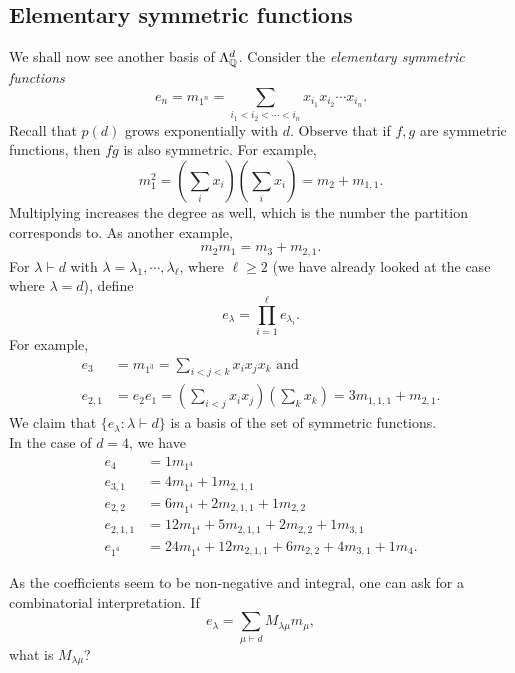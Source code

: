 \subsection{Elementary symmetric functions}

	We shall now see another basis of $\Lambda_{\mathbb{Q}}^d$. Consider the \emph{elementary symmetric functions}
	\[ e_{n} = m_{1^n} = \sum_{i_1 < i_2 < \cdots < i_n} x_{i_1} x_{i_2} \cdots x_{i_n}. \]
	Recall that $p(d)$ grows exponentially with $d$. Observe that if $f,g$ are symmetric functions, then $fg$ is also symmetric. For example,
	\[ m_1^2 = \left( \sum_i x_i \right)\left( \sum_i x_i \right) = m_2 + m_{1,1}. \]
	Multiplying increases the degree as well, which is the number the partition corresponds to. As another example,
	\[ m_2 m_1 = m_3 + m_{2,1}. \]
	For $\lambda \vdash d$ with $\lambda = \lambda_1,\cdots,\lambda_\ell$, where $\ell \ge 2$ (we have already looked at the case where $\lambda = d$), define
	\[ e_\lambda = \prod_{i=1}^\ell e_{\lambda_i}. \]
	For example,
	\begin{align*}
		e_3 &= m_{1^3} = \sum_{i < j < k} x_i x_j x_k \text{ and} \\
		e_{2,1} &= e_2e_1 = \left(\sum_{i < j} x_i x_j\right) \left(\sum_k x_k\right) = 3m_{1,1,1} + m_{2,1}.
	\end{align*}
	We claim that $\{e_\lambda : \lambda \vdash d\}$ is a basis of the set of symmetric functions.\\
	In the case of $d = 4$, we have
	\begin{align*}
		e_4 &= 1 m_{1^4} \\
		e_{3,1} &= 4m_{1^4} + 1m_{2,1,1} \\
		e_{2,2} &= 6m_{1^4} + 2m_{2,1,1} + 1m_{2,2} \\
		e_{2,1,1} &= 12m_{1^4} + 5m_{2,1,1} + 2m_{2,2} + 1m_{3,1} \\
		e_{1^4} &= 24m_{1^4} + 12m_{2,1,1} + 6m_{2,2} + 4m_{3,1} + 1m_{4}.
	\end{align*}

	As the coefficients seem to be non-negative and integral, one can ask for a combinatorial interpretation. If
	\[ e_\lambda = \sum_{\mu \vdash d} M_{\lambda\mu} m_\mu, \]
	what is $M_{\lambda\mu}$?

